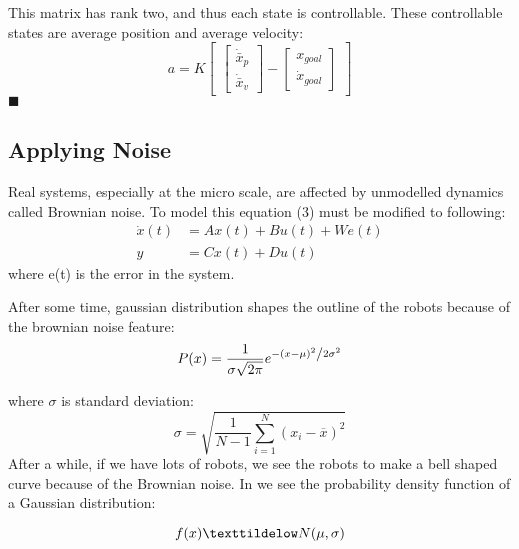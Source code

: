 \documentclass[10pt,letterpaper]{article}
\begin{document}
\begin{flushleft}
This matrix has rank two, and thus each state is controllable. These controllable states are average position and average velocity:
\begin{equation}
a = K\begin{bmatrix}
\begin{bmatrix}
\dot{\bar{x}}_p \\
\dot{\bar{x}}_v
\end{bmatrix}
-
\begin{bmatrix}
x_{goal} \\
\dot{x}_{goal}
\end{bmatrix}
\end{bmatrix}
\end{equation}
$\blacksquare$ \\

\subsection{Applying Noise}

Real systems, especially at the micro scale, are affected by unmodelled dynamics called Brownian noise. To model this equation (3) must be modified to following:
\begin{align}
\dot{x}(t)  &=  A x(t) + B u(t) + We(t)\\
y &= C x(t) + D u(t)\nonumber
\end{align}
where e(t) is the error in the system.

After some time, gaussian distribution shapes the outline of the robots because of the brownian noise feature:\\
\begin{equation}
P(x) = \frac{1}{{\sigma \sqrt {2\pi } }}e^{{{ - \left( {x - \mu } \right)^2 } \mathord{\left/ {\vphantom {{ - \left( {x - \mu } \right)^2 } {2\sigma ^2 }}} \right. \kern-\nulldelimiterspace} {2\sigma ^2 }}}
\end{equation}

where $\sigma$ is standard deviation:
\begin{equation}
\sigma = \sqrt{\frac{1}{N-1} \sum_{i=1}^N (x_i - \overline{x})^2}
\end{equation}
After a while, if we have lots of robots, we see the robots to make a bell shaped curve because of the Brownian noise. In we see the probability density function of a Gaussian distribution:\\
\end{flushleft}
\begin{equation}
f(x) \texttildelow N(\mu , \sigma)
\end{equation}
\end{document}

